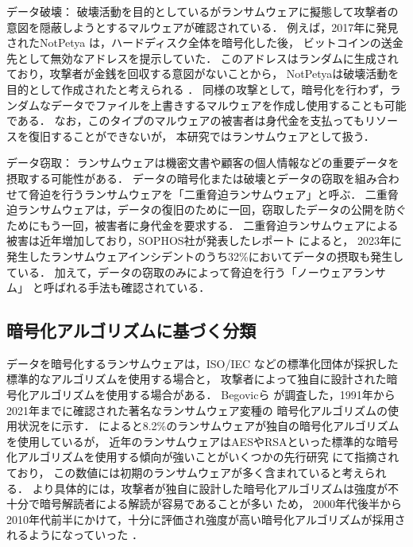 データ破壊：
破壊活動を目的としているがランサムウェアに擬態して攻撃者の意図を隠蔽しようとするマルウェアが確認されている．
例えば，2017年に発見されたNotPetya \cite{Petya-No22:online} は，ハードディスク全体を暗号化した後，
ビットコインの送金先として無効なアドレスを提示していた．
このアドレスはランダムに生成されており，攻撃者が金銭を回収する意図がないことから，
NotPetyaは破壊活動を目的として作成されたと考えられる \cite{Petya-No22:online}．
同様の攻撃として，暗号化を行わず，ランダムなデータでファイルを上書きするマルウェアを作成し使用することも可能である．
なお，このタイプのマルウェアの被害者は身代金を支払ってもリソースを復旧することができないが，
本研究ではランサムウェアとして扱う．

データ窃取：
ランサムウェアは機密文書や顧客の個人情報などの重要データを摂取する可能性がある．
データの暗号化または破壊とデータの窃取を組み合わせて脅迫を行うランサムウェアを「二重脅迫ランサムウェア」と呼ぶ．
二重脅迫ランサムウェアは，データの復旧のために一回，窃取したデータの公開を防ぐためにもう一回，被害者に身代金を要求する．
二重脅迫ランサムウェアによる被害は近年増加しており，SOPHOS社が発表したレポート \cite{sophos-report:online} によると，
2023年に発生したランサムウェアインシデントのうち32\%においてデータの摂取も発生している．
加えて，データの窃取のみによって脅迫を行う「ノーウェアランサム」\cite{nowhere-ransom} と呼ばれる手法も確認されている．

\subsection{暗号化アルゴリズムに基づく分類}
データを暗号化するランサムウェアは，ISO/IEC \cite{ISOIEC2784:online} などの標準化団体が採択した標準的なアルゴリズムを使用する場合と，
攻撃者によって独自に設計された暗号化アルゴリズムを使用する場合がある．
Begovicら \cite{begovic2023cryptographic} が調査した，1991年から2021年までに確認された著名なランサムウェア変種の
暗号化アルゴリズムの使用状況をに示す．
によると8.2\%のランサムウェアが独自の暗号化アルゴリズムを使用しているが，
近年のランサムウェアはAESやRSAといった標準的な暗号化アルゴリズムを使用する傾向が強いことがいくつかの先行研究 \cite{Evolution-Ransomware,key-management}にて指摘されており，
この数値には初期のランサムウェアが多く含まれていると考えられる．
より具体的には，攻撃者が独自に設計した暗号化アルゴリズムは強度が不十分で暗号解読者による解読が容易であることが多い \cite{key-management}ため，
2000年代後半から2010年代前半にかけて，十分に評価され強度が高い暗号化アルゴリズムが採用されるようになっていった \cite{Evolution-Ransomware}．

